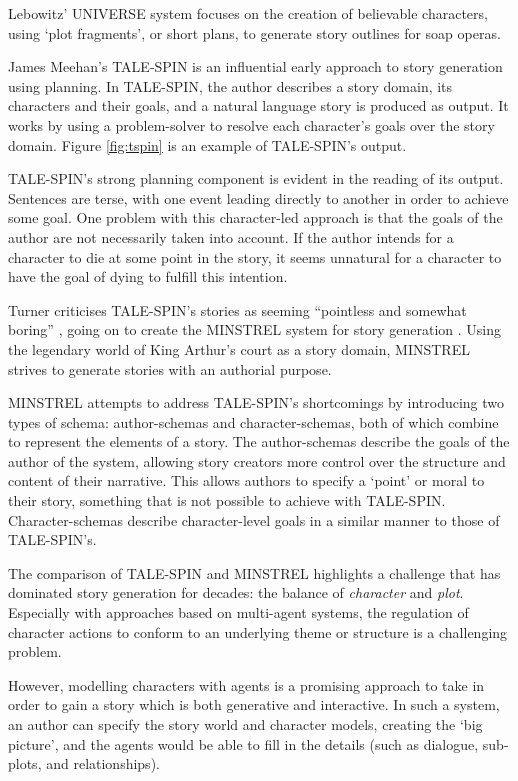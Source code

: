 Lebowitz' UNIVERSE system \citep{lebowitz1985story} focuses on the creation of believable characters, using `plot fragments', or short plans, to generate story outlines for soap operas.

James Meehan's TALE-SPIN \citep{meehan1977tale} is an influential early approach to story generation using planning. In TALE-SPIN, the author describes a story domain, its characters and their goals, and a natural language story is produced as output. It works by using a problem-solver to resolve each character's goals over the story domain. Figure \ref{fig:tspin} is an example of TALE-SPIN's output.

TALE-SPIN's strong planning component is evident in the reading of its output. Sentences are terse, with one event leading directly to another in order to achieve some goal. One problem with this character-led approach is that the goals of the author are not necessarily taken into account. If the author intends for a character to die at some point in the story, it seems unnatural for a character to have the goal of dying to fulfill this intention.

 Turner criticises TALE-SPIN's stories as seeming ``pointless and somewhat boring'' \citep{turner1986thematic}, going on to create the MINSTREL system for story generation \citep{turner1993minstrel}. Using the legendary world of King Arthur's court as a story domain, MINSTREL strives to generate stories with an authorial purpose.

MINSTREL attempts to address TALE-SPIN's shortcomings by introducing two types of schema: author-schemas and character-schemas, both of which combine to represent the elements of a story. The author-schemas describe the goals of the author of the system, allowing story creators more control over the structure and content of their narrative. This allows authors to specify a `point' or moral to their story, something that is not possible to achieve with TALE-SPIN. Character-schemas describe character-level goals in a similar manner to those of TALE-SPIN's.

The comparison of TALE-SPIN and MINSTREL highlights a challenge that has dominated story generation for decades: the balance of \emph{character} and \emph{plot}. Especially with approaches based on multi-agent systems, the regulation of character actions to conform to an underlying theme or structure is a challenging problem.

However, modelling characters with agents is a promising approach to take in order to gain a story which is both generative and interactive. In such a system, an author can specify the story world and character models, creating the `big picture', and the agents would be able to fill in the details (such as dialogue, sub-plots, and relationships).

